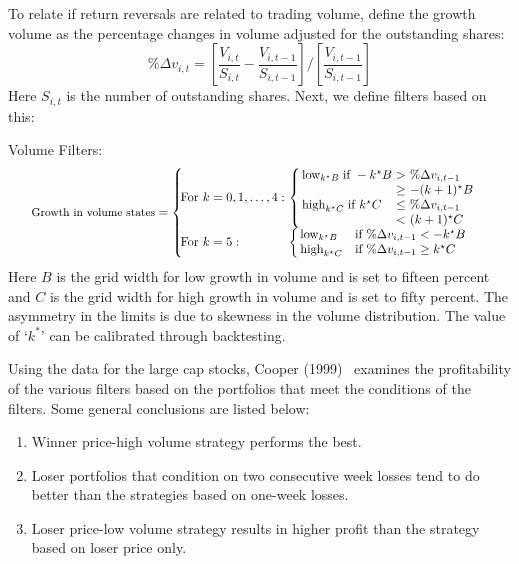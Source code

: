 To relate if return reversals are related to trading volume, define the growth volume as the percentage changes in volume adjusted for the outstanding shares: 
	\begin{equation}\label{eqn:perdeltav}
	\%\Delta v_{i,t} = \left[\frac{V_{i,t}}{S_{i,t}}-\frac{V_{i,t-1}}{S_{i,t-1}}\right] / \left[\frac{V_{i,t-1}}{S_{i,t-1}}\right]
	\end{equation}
Here $S_{i,t}$ is the number of outstanding shares. Next, we define filters based on this: \twomedskip


\noindent Volume Filters: 
	\begin{equation} \label{eqn:volfilter}
	\scalebox{0.89}{$\textrm{\small Growth in volume states} = \left\{ 
	\begin{array}{lllll}
		\!\!\!\!\textrm{For} ~k = 0,1,\ldots,4: & \!\!\!\!\left\{ 
			\begin{array}{lllll}
			\!\!\!\! \textrm{  low}_{k^\star B}\;  \textrm{if } -k^\star B &\!\!\!\!>\!\!\!\! & \!\!\!\! \%\Delta v_{i,t-1} \\
			\!\!\!\!& \!\!\!\!\geq & \!\!\!\!- (k+1)^\star B \\
	\!\!\!\! \textrm{ high}_{k^\star C}\; \textrm{if } k^\star C & \!\!\!\!\leq&\!\!\!\! \%\Delta v_{i,t-1} \\
	&\!\!\!\!<&\!\!\!\!  (k+1)^\star C
			\end{array}
		\right.\\
		\!\!\!\!\textrm{For} ~k = 5: & \!\!\!\!\left\{
		 \begin{array}{ll}
		 \!\!\!\! \textrm{ low}_{k^\star B} & \textrm{if} ~\%\Delta v_{i,t-1} <-k^\star B \\
		 \!\!\!\! \textrm{ high}_{k^\star C} & \textrm{if}  ~\%\Delta v_{i,t-1} \geq  k^\star C
		 	\end{array} \right.
		\end{array} \right. $}
	\end{equation} 
Here $B$ is the grid width for low growth in volume and is set to fifteen percent and $C$ is the grid width for high growth in volume and is set to fifty percent. The asymmetry in the limits is due to skewness in the volume distribution. The value of `$k^*$' can be calibrated through backtesting. 


Using the data for the large cap stocks, Cooper (1999)~\cite{cooper} examines the profitability of the various filters based on the portfolios that meet the conditions of the filters. Some general conclusions are listed below:
	\begin{enumerate}[--]
	\item Winner price-high volume strategy performs the best.
	\item Loser portfolios that condition on two consecutive week losses tend to do better than the strategies based on one-week losses.
	\item Loser price-low volume strategy results in higher profit than the strategy based on loser price only.
	\end{enumerate}


